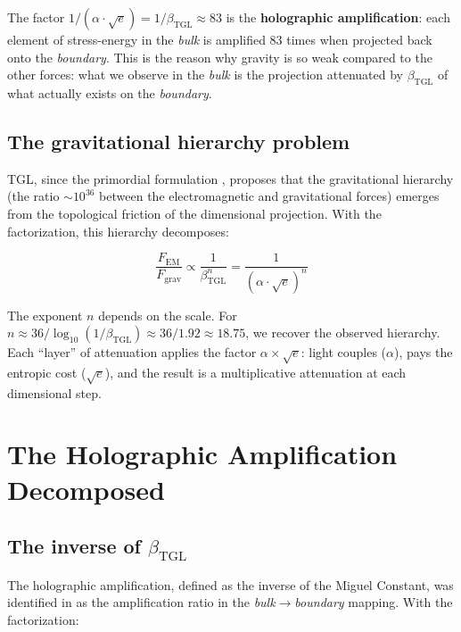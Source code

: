 \documentclass[12pt,a4paper,twoside]{article}
\newcommand{\betatgl}{\beta_{\!\scriptscriptstyle\mathrm{TGL}}}
\newcommand{\boundary}{\textit{boundary}}
\newcommand{\bulk}{\textit{bulk}}
\begin{document}
The factor $1/(\alpha \cdot \sqrt{e}) = 1/\betatgl \approx 83$ is the \textbf{holographic amplification}: each element of stress-energy in the \bulk{} is amplified 83 times when projected back onto the \boundary. This is the reason why gravity is so weak compared to the other forces: what we observe in the \bulk{} is the projection attenuated by $\betatgl$ of what actually exists on the \boundary.

\subsection{The gravitational hierarchy problem}

TGL, since the primordial formulation \cite{Miguel2026Fronteira}, proposes that the gravitational hierarchy (the ratio $\sim 10^{36}$ between the electromagnetic and gravitational forces) emerges from the topological friction of the dimensional projection. With the factorization, this hierarchy decomposes:

\begin{equation}
\frac{F_{\text{EM}}}{F_{\text{grav}}} \propto \frac{1}{\betatgl^n} = \frac{1}{(\alpha \cdot \sqrt{e})^n}
\end{equation}

The exponent $n$ depends on the scale. For $n \approx 36/\log_{10}(1/\betatgl) \approx 36/1.92 \approx 18.75$, we recover the observed hierarchy. Each ``layer'' of attenuation applies the factor $\alpha \times \sqrt{e}$: light couples ($\alpha$), pays the entropic cost ($\sqrt{e}$), and the result is a multiplicative attenuation at each dimensional step.



\section{The Holographic Amplification Decomposed}
\label{sec:amplificacao}

\subsection{The inverse of $\betatgl$}

The holographic amplification, defined as the inverse of the Miguel Constant, was identified in \cite{Miguel2026Fronteira} as the amplification ratio in the \bulk$\to$\boundary{} mapping. With the factorization:
\end{document}

